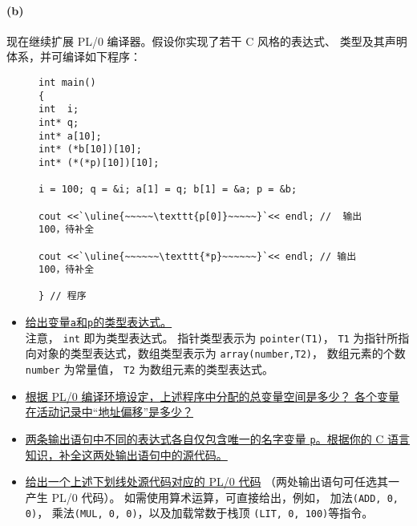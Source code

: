 \documentclass{article}
\begin{document}
\paragraph{(b)}
现在继续扩展 PL/0 编译器。假设你实现了若干 C 风格的表达式、 类型及其声明体系，并可编译如下程序：

\begin{figure}[H]
    \centering
\begin{lstlisting}[style = C++, frame = single]
int main()
{
int  i;
int* q;
int* a[10];
int* (*b[10])[10];
int* (*(*p)[10])[10];

i = 100; q = &i; a[1] = q; b[1] = &a; p = &b;

cout <<`\uline{~~~~~\texttt{p[0]}~~~~~}`<< endl; //  输出100，待补全

cout <<`\uline{~~~~~~\texttt{*p}~~~~~~}`<< endl; // 输出100，待补全

} // 程序
\end{lstlisting}
\end{figure}

\begin{itemize}
    \item \uline{给出变量\texttt{a}和\texttt{p}的类型表达式。}\\
    注意， \lstinline{int} 即为类型表达式。 指针类型表示为 \lstinline{pointer(T1)}， \lstinline{T1} 为指针所指向对象的类型表达式，数组类型表示为 \lstinline{array(number,T2)}， 数组元素的个数 \lstinline{number} 为常量值， \lstinline{T2} 为数组元素的类型表达式。
    \item \uline{根据 PL/0 编译环境设定，上述程序中分配的总变量空间是多少？ 各个变量在活动记录中“地址偏移”是多少？}
    \item \uline{两条输出语句中不同的表达式各自仅包含唯一的名字变量 \texttt{p}。根据你的 C 语言知识，补全这两处输出语句中的源代码。}
    \item \uline{给出一个上述下划线处源代码对应的 PL/0 代码} （两处输出语句可任选其一产生 PL/0 代码）。 如需使用算术运算，可直接给出，例如， 加法\lstinline{(ADD, 0, 0)}， 乘法\lstinline{(MUL, 0, 0)}，以及加载常数于栈顶 \lstinline{(LIT, 0, 100)}等指令。
\end{itemize}
\end{document}
